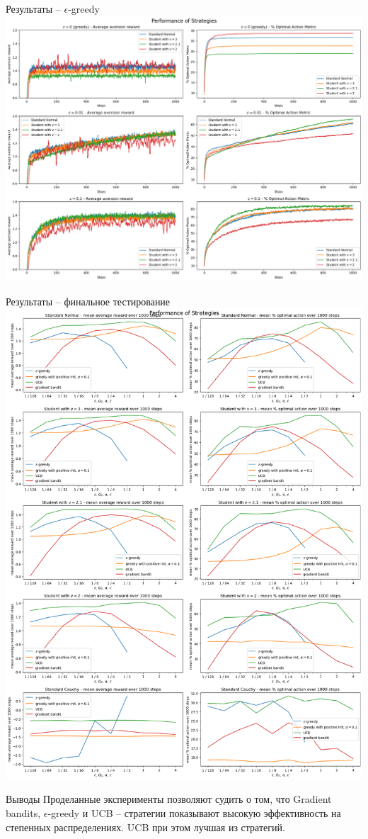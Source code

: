 \documentclass[10pt]{beamer} %
\begin{document}
\begin{frame}{Результаты -- $\epsilon$-greedy}
    \includegraphics[scale=0.2,center]{images/experiments_classic/eps_greedy/second.png}
\end{frame}
\begin{frame}{Результаты -- финальное тестирование}
    \includegraphics[scale=0.15,center]{images/experiments_classic/overall/overall.png}
\end{frame}
\begin{frame}{Выводы}
    Проделанные эксперименты позволяют судить о том, что Gradient bandits, $\epsilon$-greedy и UCB -- стратегии показывают высокую эффективность на степенных распределениях. UCB при этом лучшая из стратегий.
\end{frame}
\end{document}
